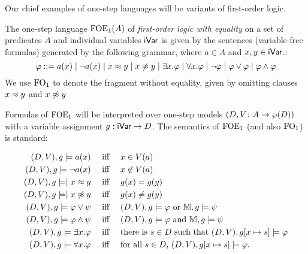Our chief examples of one-step languages will be variants of first-order logic.

\begin{definition}
The one-step language $\mathrm{FOE}_1(A)$ of \emph{first-order logic with equality} on a set of predicates $A$ and individual variables $\mathsf{iVar}$ is given by the sentences (variable-free formulas) generated by the following grammar, where $a \in A$ and $x,y\in\mathsf{iVar}$.:
\begin{equation}\label{eq:grammarofoe}
\varphi ::= a(x) \mid \lnot a(x) \mid x \foeq y \mid x \not\foeq y \mid \exists x.\varphi \mid \forall x.\varphi \mid \lnot\varphi \mid \varphi \lor \varphi \mid \varphi \land \varphi
\end{equation}
We use $\mathrm{FO}_1$ to denote the fragment without equality, given by omitting clauses $x \approx y$ and $x \not\approx y$
\end{definition}


Formulas of $\mathrm{FOE}_1$ will be interpreted over one-step models $(D,V \colon A \to \wp(D))$ with a variable assignment $g: \mathsf{iVar} \to D$. The semantics of $\mathrm{FOE}_1$ (and also $\mathrm{FO}_1$) is standard:
%

\begin{align*}
(D, \val),\ass \models a(x) & \quad\text{ iff }\quad  x \in \val(a) \\
(D, \val),\ass \models \lnot a(x) & \quad\text{ iff }\quad  x \not\in \val(a) \\
(D, \val),\ass \models \mid x \foeq y & \quad\text{ iff }\quad \ass(x) = \ass(y) \\
(D, \val),\ass \models \mid x \not\foeq y & \quad\text{ iff }\quad \ass(x) \neq \ass(y) \\
(D, \val),\ass \models \varphi\lor\psi & \quad\text{ iff }\quad  (D, \val),\ass \models \varphi \text{ or } \npmodel,\ass \models \psi \\
(D, \val),\ass \models \varphi\land\psi & \quad\text{ iff }\quad  (D, \val),\ass \models \varphi \text{ and } \npmodel,\ass \models \psi \\
(D, \val),\ass \models \exists x.\varphi & \quad\text{ iff }\quad  \text{there is $s \in D$ such that $(D, \val), \ass[x\mapsto s] \models \varphi$}\\
(D, \val),\ass \models \forall x.\varphi & \quad\text{ iff }\quad  \text{for all $s \in D$, } (D, \val), \ass[x\mapsto s] \models \varphi.
\end{align*}

